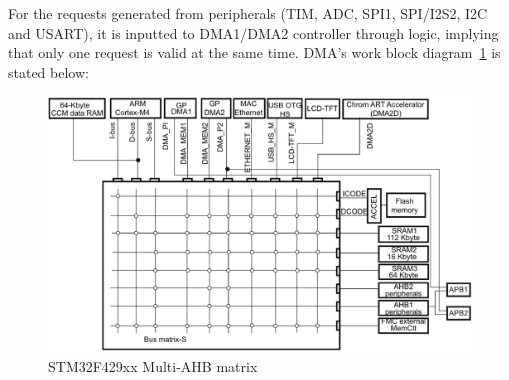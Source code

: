 For the requests generated from peripherals (TIM, ADC, SPI1, SPI/I2S2, I2C and USART), it is inputted to DMA1/DMA2 controller through logic, implying that only one request is valid at the same time. 
DMA’s work block diagram~\ref{fig:2.13} is stated below: 

\begin{figure}[!ht]
	\centering
	\includegraphics[width=15cm]{grafiken/2.13.eps}
	\caption{STM32F429xx Multi-AHB matrix} 
	\label{fig:2.13}
\end{figure}
\FloatBarrier

